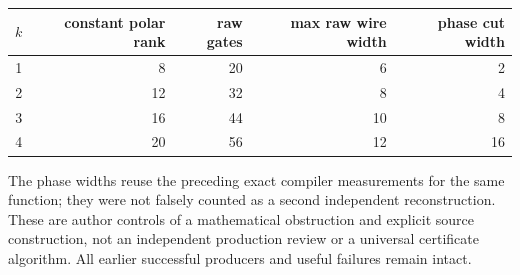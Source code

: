 \documentclass[11pt]{article}
\begin{document}
\begin{center}
\begin{tabular}{rrrrr}
\toprule
$k$ & constant polar rank & raw gates & max raw wire width & phase cut width\\
\midrule
1&8&20&6&2\\
2&12&32&8&4\\
3&16&44&10&8\\
4&20&56&12&16\\
\bottomrule
\end{tabular}
\end{center}
The phase widths reuse the preceding exact compiler measurements for the same
function; they were not falsely counted as a second independent reconstruction.
These are author controls of a mathematical obstruction and explicit source
construction, not an independent production review or a universal certificate
algorithm.  All earlier successful producers and useful failures remain intact.
\end{document}
